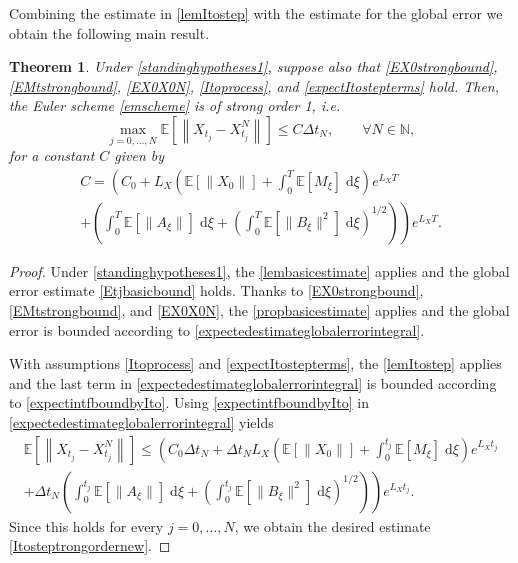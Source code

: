 \documentclass[reqno,12pt]{amsart}
\theoremstyle{plain} %
\newtheorem{theorem}{Theorem}[section]
\theoremstyle{definition} %
\begin{document}
Combining the estimate in \cref{lemItostep} with the estimate for the global error we obtain the following main result.
\begin{theorem}
    \label{thmItostep}
    Under \cref{standinghypotheses1}, suppose also that
    \eqref{EX0strongbound}, \eqref{EMtstrongbound}, \eqref{EX0X0N}, \eqref{Itoprocess}, and \eqref{expectItostepterms} hold. Then, the Euler scheme \eqref{emscheme} is of strong order 1, i.e.
    \begin{equation}
      \label{Itosteptrongordernew}
        \max_{j=0, \ldots, N}\mathbb{E}\left[ \left\| X_{t_j} - X_{t_j}^N \right\| \right] \leq C \Delta t_N, \qquad \forall N \in \mathbb{N},
    \end{equation}
    for a constant $C$ given by
    \begin{multline}
        \label{constItostepboundstrongordernew}
        C = \left( C_0 +  L_X \left(\mathbb{E}[\|X_0\|] + \int_0^T \mathbb{E}[M_\xi]\;\mathrm{d}\xi\right)e^{L_X T}\right. \\
        \left. + \left(\int_0^T \mathbb{E}[\|A_\xi\|] \;\mathrm{d}\xi + \left(\int_0^T \mathbb{E}[\|B_\xi\|^2] \;\mathrm{d}\xi \right)^{1/2}\right)\right) e^{L_X T}.
    \end{multline}
\end{theorem}

\begin{proof}
    Under \cref{standinghypotheses1}, the \cref{lembasicestimate} applies and the global error estimate \eqref{Etjbasicbound} holds. Thanks to \eqref{EX0strongbound}, \eqref{EMtstrongbound}, and \eqref{EX0X0N}, the \cref{propbasicestimate} applies and the global error is bounded according to \eqref{expectedestimateglobalerrorintegral}.
    
    With assumptions \eqref{Itoprocess} and \eqref{expectItostepterms}, the \cref{lemItostep} applies and the last term in \eqref{expectedestimateglobalerrorintegral} is bounded according to \eqref{expectintfboundbyIto}. Using \eqref{expectintfboundbyIto} in \eqref{expectedestimateglobalerrorintegral} yields
    \begin{multline*}
        \mathbb{E} \left[\left\|X_{t_j} - X_{t_j}^N\right\|\right] \leq \left( C_0 \Delta t_N + \Delta t_N L_X \left(\mathbb{E}[\|X_0\|] + \int_0^{t_j} \mathbb{E}[M_\xi]\;\mathrm{d}\xi\right)e^{L_X t_j}\right. \\
        \left. + \Delta t_N \left(\int_0^{t_j} \mathbb{E}[\|A_\xi\|] \;\mathrm{d}\xi + \left(\int_0^{t_j} \mathbb{E}[\|B_\xi\|^2] \;\mathrm{d}\xi \right)^{1/2}\right)\right) e^{L_X t_j}.
    \end{multline*}
    Since this holds for every $j=0, \ldots, N$, we obtain the desired estimate \eqref{Itosteptrongordernew}.
\end{proof}
\end{document}
